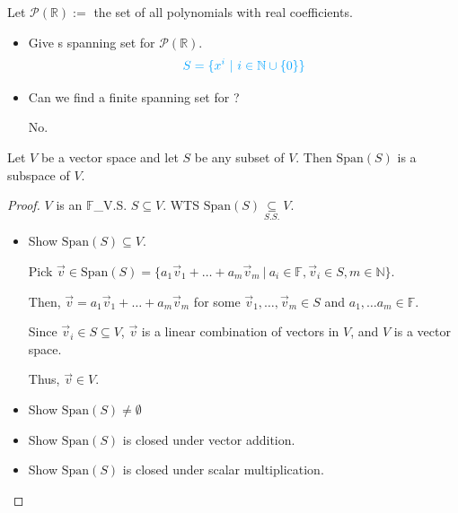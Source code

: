 \documentclass[11pt,fleqn]{book} %
\begin{document}
\begin{example}
    Let $\mathcal{P}(\mathbb{R}):=$ the set of all polynomials with real coefficients. 

    \begin{itemize}
        \item Give s spanning set for $\mathcal{P}(\mathbb{R})$. 
        $$\color{lightblue} S = \{ x^i ~|~ i \in \mathbb{N} \cup \{0\} \} $$
        
        \vspace{-0.5cm}
        \item Can we find a finite spanning set for ? 

        {\color{lightblue} No. }
    \end{itemize}
\end{example}

\setcounter{dummy}{3}
\begin{theorem}
    Let $V$ be a vector space and let $S$ be any subset of $V$. Then $\mathrm{Span}(S)$ is a subspace of $V$.
\end{theorem}

\begin{proof}
    $V$ is an $\mathbb{F}$\_V.S. $S \subseteq V$. WTS $\mathrm{Span}(S) \underset{S.S.}{\subseteq} V$. 
    
    \begin{itemize}
        \item Show $\mathrm{Span}(S) \subseteq V$. 
        
        Pick $\vec{v} \in \mathrm{Span}\left( S \right) = \{ a_1\vec{v}_1 + \dots + a_m\vec{v}_m ~|~ a_i \in \mathbb{F}, \vec{v}_i \in S, m \in \mathbb{N} \}$. 
        
        Then, $\vec{v} = a_1\vec{v}_1 + \dots + a_m\vec{v}_m$ for some $\vec{v}_1, \dots, \vec{v}_m \in S$ and $a_1,\dots a_m  \in \mathbb{F}$. 
        
        Since $\vec{v}_i \in S \subseteq V$, $\vec{v}$ is a linear combination of vectors in $V$, and $V$ is a vector space. 
        
        Thus, $\vec{v} \in V$. 
        
        \item Show $\mathrm{Span}(S) \neq \emptyset$

        \item Show $\mathrm{Span}(S)$ is closed under vector addition. 

        \item Show $\mathrm{Span}(S)$ is closed under scalar multiplication. 
    \end{itemize}
\end{proof}
\end{document}
